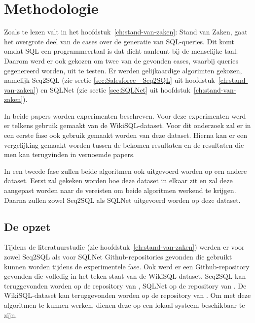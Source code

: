 
\chapter{Methodologie}
\label{ch:methodologie}


Zoals te lezen valt in het hoofdstuk~\ref{ch:stand-van-zaken}: Stand van Zaken, gaat het overgrote deel van de cases over de generatie van SQL-queries. Dit komt omdat SQL een programmeertaal is dat dicht aanleunt bij de menselijke taal. Daarom werd er ook gekozen om twee van de gevonden cases, waarbij queries gegenereerd worden, uit te testen. Er werden gelijkaardige algorimten gekozen, namelijk Seq2SQL (zie sectie \ref{sec:Salesforce - Seq2SQL} uit hoofdstuk~\ref{ch:stand-van-zaken}) en SQLNet (zie sectie \ref{sec:SQLNet} uit hoofdstuk~\ref{ch:stand-van-zaken}).

In beide papers worden experimenten beschreven. Voor deze experimenten werd er telkens gebruik gemaakt van de WikiSQL-dataset. Voor dit onderzoek zal er in een eerste fase ook gebruik gemaakt worden van deze dataset. Hierna kan er een vergelijking gemaakt worden tussen de bekomen resultaten en de resultaten die men kan terugvinden in vernoemde papers. 

In een tweede fase zullen beide algoritmen ook uitgevoerd worden op een andere dataset. Eerst zal gekeken worden hoe deze dataset in elkaar zit en zal deze aangepast worden naar de vereisten om beide algoritmen werkend te krijgen. Daarna zullen zowel Seq2SQL als SQLNet uitgevoerd worden op deze dataset. 

\section{De opzet}
\label{sec:opzet}

Tijdens de literatuurstudie (zie hoofdstuk~\ref{ch:stand-van-zaken}) werden er voor zowel Seq2SQL als voor SQLNet Github-repositories gevonden die gebruikt kunnen worden tijdens de experimentele fase. Ook werd er een Github-repository gevonden die volledig in het teken staat van de WikiSQL dataset. Seq2SQL kan teruggevonden worden op de repository van \textcite{seq2sql}, SQLNet op de repository van \textcite{sqlnet}. De WikiSQL-dataset kan teruggevonden worden op de repository van \textcite{wikisql}. Om met deze algoritmen te kunnen werken, dienen deze op een lokaal systeem beschikbaar te zijn. 

